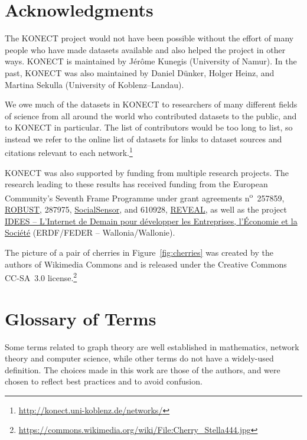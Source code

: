 \documentclass{article}
\begin{document}
\section*{Acknowledgments}
The KONECT project would not have been possible without the
effort of many people who have made datasets available and also helped
the project in other ways.   
KONECT is maintained by Jérôme Kunegis (University of Namur). 
In the past, KONECT was also maintained by Daniel Dünker, Holger Heinz,
and Martina Sekulla (University of Koblenz--Landau). 

We owe much of the datasets in KONECT to researchers of many different
fields of science from all around the world who contributed datasets to
the public, and to KONECT in particular.  The list of contributors would
be too long to list, so instead we refer to the online list of datasets
for links to dataset sources and citations relevant to each
network.\footnote{\url{http://konect.uni-koblenz.de/networks/}}

KONECT was also supported by funding from multiple research projects. 
The research leading to
these results has received funding from the European Community's Seventh
Frame Programme under grant agreements n\textsuperscript{o}~257859,
\href{http://robust-project.eu/}{ROBUST}, 287975,
\href{http://www.socialsensor.eu/}{SocialSensor}, and 610928,
\href{http://revealproject.eu/}{REVEAL}, as well as the project
\href{http://nouvelles.unamur.be/upnews.2015-10-01.8995593781}{IDEES --
  L'Internet de Demain pour développer les Entreprises, l'Économie et la
  Société} (ERDF/FEDER -- Wallonia/Wallonie). 

The picture of a pair of cherries in Figure~\ref{fig:cherries} was
created by the authors of Wikimedia Commons and is released under the
Creative Commons CC-SA~3.0 license.\footnote{\url{https://commons.wikimedia.org/wiki/File:Cherry_Stella444.jpg}}

\let\oldbibliography\thebibliography
\renewcommand{\thebibliography}[1]{%
  \oldbibliography{#1}%
  \setlength{\itemsep}{0pt}%
}



\appendix

\section{Glossary of Terms}
Some terms related to graph theory are well established in mathematics,
network theory and computer science, while other terms do not have a
widely-used definition.  
The choices made in this work are those of the authors, and were chosen
to reflect best practices and to avoid confusion.
\end{document}
